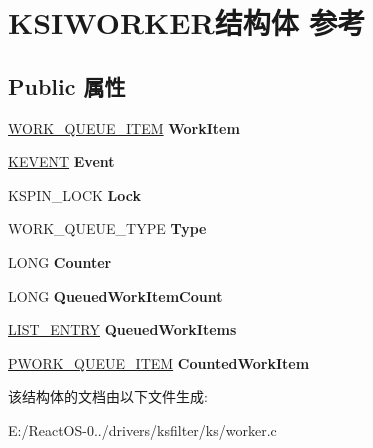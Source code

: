 \hypertarget{struct_k_s_i_w_o_r_k_e_r}{}\section{K\+S\+I\+W\+O\+R\+K\+E\+R结构体 参考}
\label{struct_k_s_i_w_o_r_k_e_r}
\subsection*{Public 属性}
\begin{DoxyCompactItemize}
\item 
\mbox{\label{struct_k_s_i_w_o_r_k_e_r_a0184ec04c4c567f5194e7f1dc00f3f4c}} 
\hyperlink{struct___w_o_r_k___q_u_e_u_e___i_t_e_m}{W\+O\+R\+K\+\_\+\+Q\+U\+E\+U\+E\+\_\+\+I\+T\+EM} {\bfseries Work\+Item}
\item 
\mbox{\label{struct_k_s_i_w_o_r_k_e_r_a5f07391b3924663665b3f331e10b82e4}} 
\hyperlink{struct___k_e_v_e_n_t}{K\+E\+V\+E\+NT} {\bfseries Event}
\item 
\mbox{\label{struct_k_s_i_w_o_r_k_e_r_ab36bdf8d91f2073aeceeeba911fcafd3}} 
K\+S\+P\+I\+N\+\_\+\+L\+O\+CK {\bfseries Lock}
\item 
\mbox{\label{struct_k_s_i_w_o_r_k_e_r_a4a65cfe4fd1a738511cb3494eee0d6cb}} 
W\+O\+R\+K\+\_\+\+Q\+U\+E\+U\+E\+\_\+\+T\+Y\+PE {\bfseries Type}
\item 
\mbox{\label{struct_k_s_i_w_o_r_k_e_r_a6098f31c7b512a106151c9001b49fe1e}} 
L\+O\+NG {\bfseries Counter}
\item 
\mbox{\label{struct_k_s_i_w_o_r_k_e_r_a7a062f2d0fee7baf2855e6e4f59d3d71}} 
L\+O\+NG {\bfseries Queued\+Work\+Item\+Count}
\item 
\mbox{\label{struct_k_s_i_w_o_r_k_e_r_ac74e48e4d2177963b57e9efc4e9c2bdc}} 
\hyperlink{struct___l_i_s_t___e_n_t_r_y}{L\+I\+S\+T\+\_\+\+E\+N\+T\+RY} {\bfseries Queued\+Work\+Items}
\item 
\mbox{\label{struct_k_s_i_w_o_r_k_e_r_ac71934fc09f6646f1552a5691da81f52}} 
\hyperlink{struct___w_o_r_k___q_u_e_u_e___i_t_e_m}{P\+W\+O\+R\+K\+\_\+\+Q\+U\+E\+U\+E\+\_\+\+I\+T\+EM} {\bfseries Counted\+Work\+Item}
\end{DoxyCompactItemize}


该结构体的文档由以下文件生成\+:\begin{DoxyCompactItemize}
\item 
E\+:/\+React\+O\+S-\/0../drivers/ksfilter/ks/worker.\+c\end{DoxyCompactItemize}
